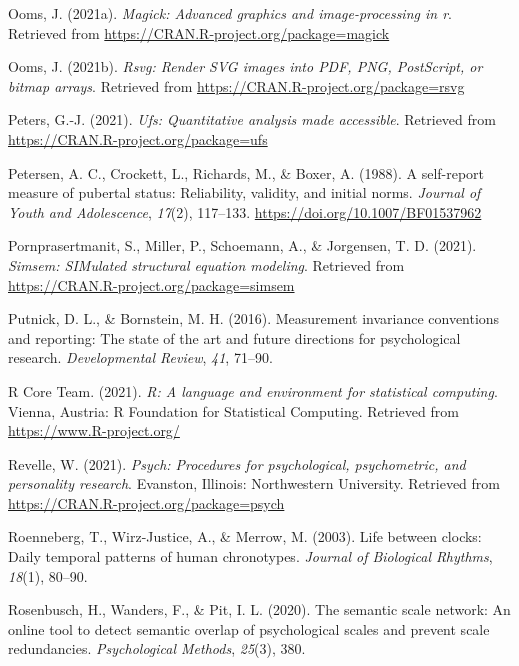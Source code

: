 \documentclass[
  english,
  man]{apa6}
\newlength{\cslhangindent}
\newlength{\cslentryspacingunit} %
\newenvironment{CSLReferences}[2] %
 {%
  \setlength{\parindent}{0pt}
  \ifodd #1
  \let\oldpar\par
  \def\par{\hangindent=\cslhangindent\oldpar}
  \fi
  \setlength{\parskip}{#2\cslentryspacingunit}
 }%
 {}
\begin{document}
\begin{CSLReferences}{1}{0}
\leavevmode{}%
Ooms, J. (2021a). \emph{Magick: Advanced graphics and image-processing in r}. Retrieved from \url{https://CRAN.R-project.org/package=magick}

\leavevmode{}%
Ooms, J. (2021b). \emph{Rsvg: Render SVG images into PDF, PNG, PostScript, or bitmap arrays}. Retrieved from \url{https://CRAN.R-project.org/package=rsvg}

\leavevmode{}%
Peters, G.-J. (2021). \emph{Ufs: Quantitative analysis made accessible}. Retrieved from \url{https://CRAN.R-project.org/package=ufs}

\leavevmode{}%
Petersen, A. C., Crockett, L., Richards, M., \& Boxer, A. (1988). A self-report measure of pubertal status: Reliability, validity, and initial norms. \emph{Journal of Youth and Adolescence}, \emph{17}(2), 117--133. \url{https://doi.org/10.1007/BF01537962}

\leavevmode{}%
Pornprasertmanit, S., Miller, P., Schoemann, A., \& Jorgensen, T. D. (2021). \emph{Simsem: SIMulated structural equation modeling}. Retrieved from \url{https://CRAN.R-project.org/package=simsem}

\leavevmode{}%
Putnick, D. L., \& Bornstein, M. H. (2016). Measurement invariance conventions and reporting: The state of the art and future directions for psychological research. \emph{Developmental Review}, \emph{41}, 71--90.

\leavevmode{}%
R Core Team. (2021). \emph{R: A language and environment for statistical computing}. Vienna, Austria: R Foundation for Statistical Computing. Retrieved from \url{https://www.R-project.org/}

\leavevmode{}%
Revelle, W. (2021). \emph{Psych: Procedures for psychological, psychometric, and personality research}. Evanston, Illinois: Northwestern University. Retrieved from \url{https://CRAN.R-project.org/package=psych}

\leavevmode{}%
Roenneberg, T., Wirz-Justice, A., \& Merrow, M. (2003). Life between clocks: Daily temporal patterns of human chronotypes. \emph{Journal of Biological Rhythms}, \emph{18}(1), 80--90.

\leavevmode{}%
Rosenbusch, H., Wanders, F., \& Pit, I. L. (2020). The semantic scale network: An online tool to detect semantic overlap of psychological scales and prevent scale redundancies. \emph{Psychological Methods}, \emph{25}(3), 380.


\end{CSLReferences}
\end{document}
